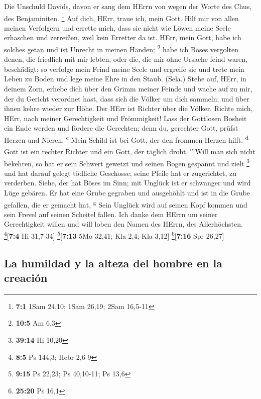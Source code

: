  Die Unschuld Davids, davon er sang dem HErrn von wegen
der Worte des Chus, des Benjaminiten. \footnote{\textbf{7:1} 1Sam 24,10;
  1Sam 26,19; 2Sam 16,5-11}  Auf dich, HErr, traue ich,
mein Gott. Hilf mir von allen meinen Verfolgern und errette mich,
 dass sie nicht wie Löwen meine Seele erhaschen und
zerreißen, weil kein Erretter da ist.  HErr, mein Gott,
habe ich solches getan und ist Unrecht in meinen Händen; \footnote{\textbf{10:5}
  Am 6,3}  habe ich Böses vergolten denen, die friedlich
mit mir lebten, oder die, die mir ohne Ursache feind waren, beschädigt:
 so verfolge mein Feind meine Seele und ergreife sie und
trete mein Leben zu Boden und lege meine Ehre in den Staub. (Sela.)
 Stehe auf, HErr, in deinem Zorn, erhebe dich über den
Grimm meiner Feinde und wache auf zu mir, der du Gericht verordnet hast,
 dass sich die Völker um dich sammeln; und über ihnen
kehre wieder zur Höhe.  Der HErr ist Richter über die
Völker. Richte mich, HErr, nach meiner Gerechtigkeit und Frömmigkeit!
 Lass der Gottlosen Bosheit ein Ende werden und fördere
die Gerechten; denn du, gerechter Gott, prüfst Herzen und Nieren.
\textsuperscript{c}  Mein Schild ist bei Gott, der den
frommen Herzen hilft. \textsuperscript{d}  Gott ist ein
rechter Richter und ein Gott, der täglich droht. \textsuperscript{e}
 Will man sich nicht bekehren, so hat er sein Schwert
gewetzt und seinen Bogen gespannt und zielt \footnote{\textbf{39:14} Hi
  10,20}  und hat darauf gelegt tödliche Geschosse; seine
Pfeile hat er zugerichtet, zu verderben.  Siehe, der hat
Böses im Sinn; mit Unglück ist er schwanger und wird Lüge gebären.
 Er hat eine Grube gegraben und ausgehöhlt und ist in die
Grube gefallen, die er gemacht hat, \textsuperscript{g} 
Sein Unglück wird auf seinen Kopf kommen und sein Frevel auf seinen
Scheitel fallen.  Ich danke dem HErrn um seiner
Gerechtigkeit willen und will loben den Namen des HErrn, des
Allerhöchsten. \footnote{\textbf{8:5} Ps 144,3; Hebr 2,6-9}{[}\textbf{7:4}
Hi 31,7-34{]} \footnote{\textbf{9:15} Ps 22,23; Ps 40,10-11; Ps 13,6}{[}\textbf{7:13}
5Mo 32,41; Kla 2,4; Kla 3,12{]} \footnote{\textbf{25:20} Ps 16,1}{[}\textbf{7:16}
Spr 26,27{]}

\hypertarget{la-humildad-y-la-alteza-del-hombre-en-la-creaciuxf3n}{%
\subsection{La humildad y la alteza del hombre en la
creación}\label{la-humildad-y-la-alteza-del-hombre-en-la-creaciuxf3n}}


